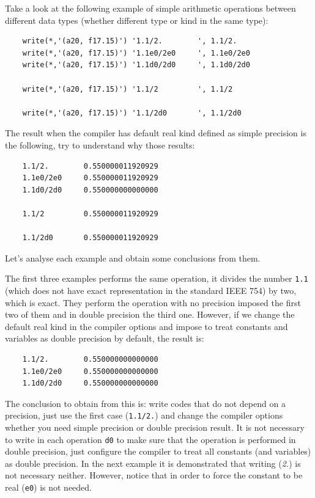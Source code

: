 
Take a look at the following example of simple arithmetic operations between different data types (whether different type or kind in the same type):

\begin{verbatim} 
    write(*,'(a20, f17.15)') '1.1/2.        ', 1.1/2. 
    write(*,'(a20, f17.15)') '1.1e0/2e0     ', 1.1e0/2e0
    write(*,'(a20, f17.15)') '1.1d0/2d0     ', 1.1d0/2d0 
        
    write(*,'(a20, f17.15)') '1.1/2         ', 1.1/2
    
    write(*,'(a20, f17.15)') '1.1/2d0       ', 1.1/2d0
\end{verbatim}

The result when the compiler has default real kind defined as simple precision is the following, try to understand why those results:

\begin{verbatim}
    1.1/2.        0.550000011920929 
    1.1e0/2e0     0.550000011920929 
    1.1d0/2d0     0.550000000000000 

    1.1/2         0.550000011920929 

    1.1/2d0       0.550000011920929 
\end{verbatim}

Let's analyse each example and obtain some conclusions from them. 

The first three examples performs the same operation, it divides the number \texttt{1.1} (which does not have exact representation in the standard IEEE 754) by two, which is exact. They perform the operation with no precision imposed the first two of them and in double precision the third one. However, if we change the default real kind in the compiler options and impose to treat constants and variables as double precision by default, the result is:

\begin{verbatim}
    1.1/2.        0.550000000000000
    1.1e0/2e0     0.550000000000000
    1.1d0/2d0     0.550000000000000
\end{verbatim}

The conclusion to obtain from this is: write codes that do not depend on a precision, just use the first case (\texttt{1.1/2.}) and change the compiler options whether you need simple precision or double precision result. It is not necessary to write in each operation \texttt{d0} to make sure that the operation is performed in double precision, just configure the compiler to treat all constants (and variables) as double precision. In the next example it is demonstrated that writing (\textit{2.}) is not necessary neither. However, notice that in order to force the constant to be real (\texttt{e0}) is not needed. 

